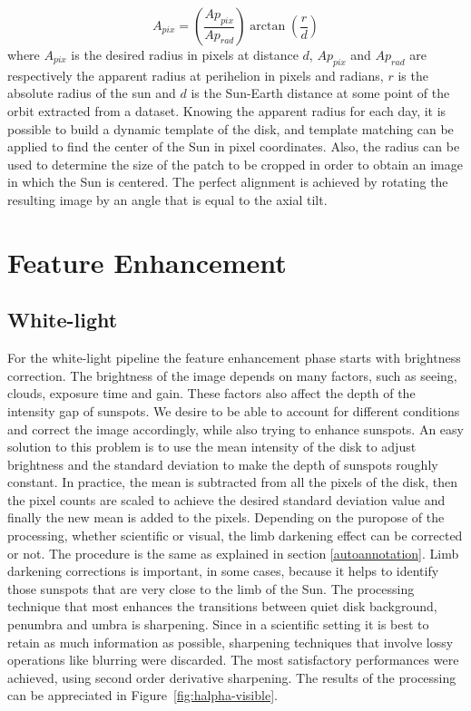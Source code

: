 \begin{equation}
  A_{pix} = \left( \frac{Ap_{pix}}{Ap_{rad}} \right)  \arctan{\left(\frac{r}{d}\right)}
  \label{eq:radpix}
\end{equation}
where $A_{pix}$ is the desired radius in pixels at distance $d$, $Ap_{pix}$ and $Ap_{rad}$ are respectively the apparent radius at perihelion in pixels and radians, $r$ is the absolute radius of the sun and $d$ is the Sun-Earth distance at some point of the orbit extracted from a dataset.
\bigbreak
\noindent Knowing the apparent radius for each day, it is possible to build a dynamic template of the disk, and template matching can be applied to find the center of the Sun in pixel coordinates. Also, the radius can be used to determine the size of the patch to be cropped in order to obtain an image in which the Sun is centered. The perfect alignment is achieved by rotating the resulting image by an angle that is equal to the axial tilt.

\section{Feature Enhancement}
\subsection{White-light}
\noindent For the white-light pipeline the feature enhancement phase starts with brightness correction. The brightness of the image depends on many factors, such as seeing, clouds, exposure time and gain. These factors also affect the depth of the intensity gap of sunspots. We desire to be able to account for different conditions and correct the image accordingly, while also trying to enhance sunspots.
\bigbreak
\noindent An easy solution to this problem is to use the mean intensity of the disk to adjust brightness and the standard deviation to make the depth of sunspots roughly constant. In practice, the mean is subtracted from all the pixels of the disk, then the pixel counts are scaled to achieve the desired standard deviation value and finally the new mean is added to the pixels.
\bigbreak
\noindent Depending on the puropose of the processing, whether scientific or visual, the limb darkening effect can be corrected or not. The procedure is the same as explained in section \ref{autoannotation}. Limb darkening corrections is important, in some cases, because it helps to identify those sunspots that are very close to the limb of the Sun.
\bigbreak
\noindent The processing technique that most enhances the transitions between quiet disk background, penumbra and umbra is sharpening. Since in a scientific setting it is best to retain as much information as possible, sharpening techniques that involve lossy operations like blurring were discarded. The most satisfactory performances were achieved, using second order derivative sharpening.
\bigbreak
\noindent The results of the processing can be appreciated in Figure~\ref{fig:halpha-visible}.

